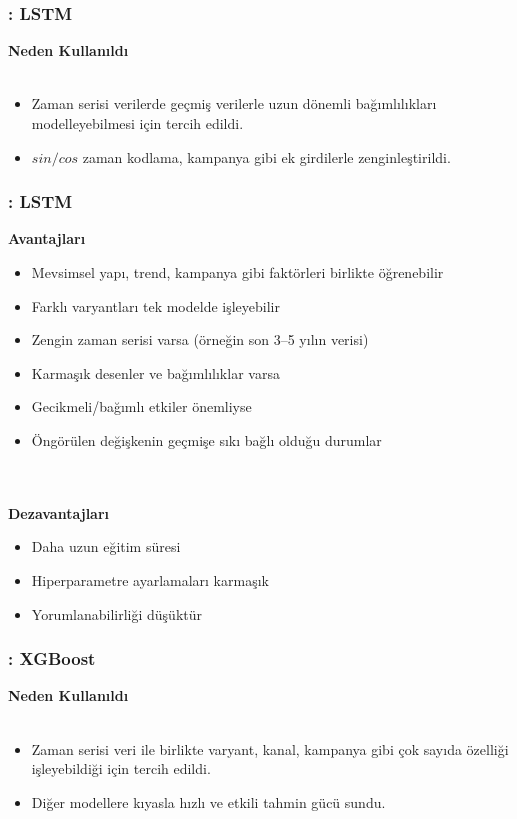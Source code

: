 \documentclass[12pt]{beamer}
\begin{document}
	\begin{frame}
		\frametitle{\insertsection: LSTM}
		\textbf{Neden Kullanıldı} \\~\\
		\begin{itemize}
			\item Zaman serisi verilerde geçmiş verilerle uzun dönemli
			bağımlılıkları modelleyebilmesi için tercih edildi.
			\item $sin/cos$ zaman kodlama, kampanya gibi ek girdilerle
			zenginleştirildi.
		\end{itemize}
	\end{frame}
	
	\begin{frame}
		\frametitle{\insertsection: LSTM}
		\textbf{Avantajları}
		\begin{itemize}
			\item Mevsimsel yapı, trend, kampanya gibi faktörleri birlikte
			öğrenebilir
			\item Farklı varyantları tek modelde işleyebilir
			\item Zengin zaman serisi varsa (örneğin son 3–5 yılın verisi)
			\item Karmaşık desenler ve bağımlılıklar varsa
			\item Gecikmeli/bağımlı etkiler önemliyse
			\item Öngörülen değişkenin geçmişe sıkı bağlı olduğu durumlar
		\end{itemize} \\~\\
		
		\textbf{Dezavantajları}
		\begin{itemize}
			\item Daha uzun eğitim süresi
			\item Hiperparametre ayarlamaları karmaşık
			\item Yorumlanabilirliği düşüktür
		\end{itemize}
	\end{frame}
	
	\begin{frame}
		\frametitle{\insertsection: XGBoost}
		\textbf{Neden Kullanıldı} \\~\\
		\begin{itemize}
			\item Zaman serisi veri ile birlikte varyant, kanal, kampanya gibi çok sayıda özelliği işleyebildiği için tercih edildi.
			\item Diğer modellere kıyasla hızlı ve etkili tahmin gücü sundu.
		\end{itemize}
	\end{frame}
	
\end{document}
